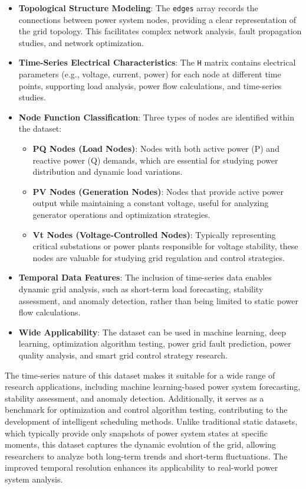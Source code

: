 \documentclass[12pt]{article}
\begin{document}
\begin{itemize}
    \item \textbf{\small Topological Structure Modeling}: The \texttt{edges} array records the connections between power system nodes, providing a clear representation of the grid topology. This facilitates complex network analysis, fault propagation studies, and network optimization.  
    \item \textbf{\small Time-Series Electrical Characteristics}: The \texttt{H} matrix contains electrical parameters (e.g., voltage, current, power) for each node at different time points, supporting load analysis, power flow calculations, and time-series studies.  
    \item \textbf{\small Node Function Classification}: Three types of nodes are identified within the dataset:
    \begin{itemize}
        \item \textbf{\small PQ Nodes (Load Nodes)}: Nodes with both active power (P) and reactive power (Q) demands, which are essential for studying power distribution and dynamic load variations.  
        \item \textbf{\small PV Nodes (Generation Nodes)}: Nodes that provide active power output while maintaining a constant voltage, useful for analyzing generator operations and optimization strategies.  
        \item \textbf{\small Vt Nodes (Voltage-Controlled Nodes)}: Typically representing critical substations or power plants responsible for voltage stability, these nodes are valuable for studying grid regulation and control strategies.  
    \end{itemize}
    \item \textbf{\small Temporal Data Features}: The inclusion of time-series data enables dynamic grid analysis, such as short-term load forecasting, stability assessment, and anomaly detection, rather than being limited to static power flow calculations.  
    \item \textbf{\small Wide Applicability}: The dataset can be used in machine learning, deep learning, optimization algorithm testing, power grid fault prediction, power quality analysis, and smart grid control strategy research.  
\end{itemize}

The time-series nature of this dataset makes it suitable for a wide range of research applications,
including machine learning-based power system forecasting, stability assessment, and anomaly detection.
Additionally, it serves as a benchmark for optimization and control algorithm testing, contributing to the development of intelligent scheduling methods.
Unlike traditional static datasets, which typically provide only snapshots of power system states at specific moments, this dataset captures the dynamic evolution of
the grid, allowing researchers to analyze both long-term trends and short-term fluctuations. The improved temporal resolution enhances its applicability to real-world
power system analysis.  
\end{document}
